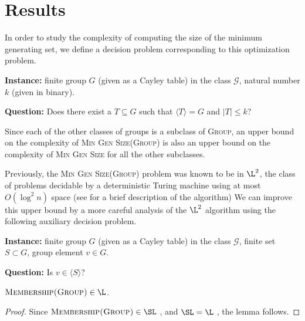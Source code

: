 \documentclass{article}
\newcommand{\gen}[1]{{\langle #1 \rangle}}
\begin{document}
\section{Results}

In order to study the complexity of computing the size of the minimum generating set, we define a decision problem corresponding to this optimization problem.

\begin{definition}
  \mbox{}

  \textbf{Instance:} finite group $G$ (given as a Cayley table) in the class $\mathcal{G}$, natural number $k$ (given in binary).

  \textbf{Question:} Does there exist a $T \subseteq G$ such that $\gen{T} = G$ and $|T| \leq k$?
\end{definition}

Since each of the other classes of groups is a subclass of \textsc{Group}, an upper bound on the complexity of \textsc{Min Gen Size(Group)} is also an upper bound on the complexity of \textsc{Min Gen Size} for all the other subclasses.

Previously, the \textsc{Min Gen Size(Group)} problem was known to be in $\L^2$, the class of problems decidable by a deterministic Turing machine using at most $O(\log^2 n)$ space \cite{lsz77} (see \cite[Proposition~3]{at06} for a brief description of the algorithm)
We can improve this upper bound by a more careful analysis of the $\L^2$ algorithm using the following auxiliary decision problem.

\begin{definition}
  \mbox{}

  \textbf{Instance:} finite group $G$ (given as a Cayley table) in the class $\mathcal{G}$, finite set $S \subset G$, group element $v \in G$.

  \textbf{Question:} Is $v \in \gen{S}$?
\end{definition}

\begin{lemma}\label{lem:membershipinl}
  $\textsc{Membership(Group)} \in \L$.
\end{lemma}
\begin{proof}
  Since $\textsc{Membership(Group)} \in \SL$ \cite[Section~3]{bm89}, and $\SL = \L$ \cite{reingold08}, the lemma follows.
\end{proof}
\end{document}
